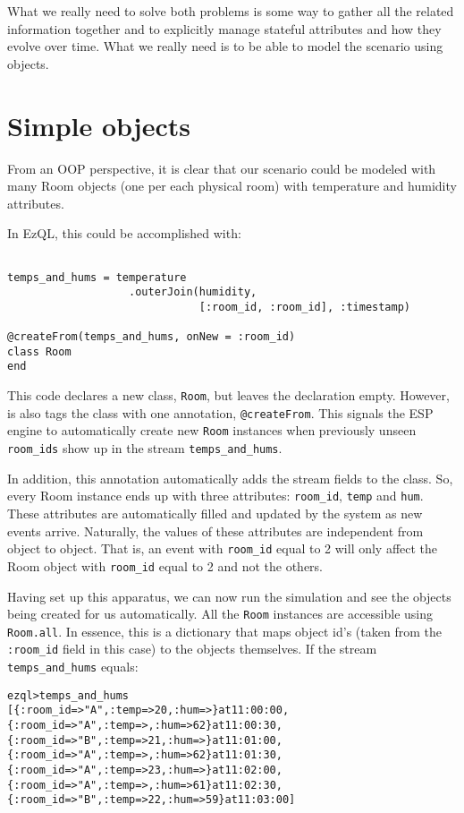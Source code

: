 \documentclass{report}
\newenvironment{evaluation}
{
  \framed
  \begin{alltt}
}
{
  \end{alltt}
  \endframed
}
\begin{document}
What we really need to solve both problems is some way to gather all
the related information together and to explicitly manage stateful
attributes and how they evolve over time. What we really need is to be
able to model the scenario using objects.

\section{Simple objects}
\label{sec:simple-objects}

From an OOP perspective, it is clear that our scenario could be
modeled with many Room objects (one per each physical room) with
temperature and humidity attributes.

In EzQL, this could be accomplished with:

\begin{verbatim}

temps_and_hums = temperature
                   .outerJoin(humidity,
                              [:room_id, :room_id], :timestamp)

@createFrom(temps_and_hums, onNew = :room_id)
class Room
end
\end{verbatim}

This code declares a new class, \verb=Room=, but leaves the
declaration empty. However, is also tags the class with one
annotation, \verb=@createFrom=. This signals the ESP engine to
automatically create new \verb=Room= instances when previously unseen
\verb=room_ids= show up in the stream \verb=temps_and_hums=.

In addition, this annotation automatically adds the stream fields to
the class. So, every Room instance ends up with three attributes:
\verb=room_id=, \verb=temp= and \verb=hum=. These attributes are
automatically filled and updated by the system as new events
arrive. Naturally, the values of these attributes are independent from
object to object. That is, an event with \verb=room_id= equal to 2
will only affect the Room object with \verb=room_id= equal to 2 and
not the others.

Having set up this apparatus, we can now run the simulation and see
the objects being created for us automatically. All the \verb=Room=
instances are accessible using \verb=Room.all=. In essence, this is a
dictionary that maps object id's (taken from the \verb=:room_id= field
in this case) to the objects themselves. If the stream \verb=temps_and_hums= equals:

\begin{evaluation}
ezql> temps_and_hums
[\{ :room_id => "A", :temp =>  20, :hum =>     \} at 11:00:00,
 \{ :room_id => "A", :temp =>    , :hum =>  62 \} at 11:00:30,
 \{ :room_id => "B", :temp =>  21, :hum =>     \} at 11:01:00,
 \{ :room_id => "A", :temp =>    , :hum =>  62 \} at 11:01:30,
 \{ :room_id => "A", :temp =>  23, :hum =>     \} at 11:02:00,
 \{ :room_id => "A", :temp =>    , :hum =>  61 \} at 11:02:30,
 \{ :room_id => "B", :temp =>  22, :hum =>  59 \} at 11:03:00]
\end{evaluation}
\end{document}
